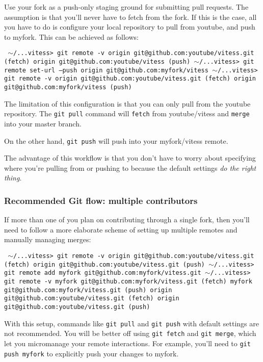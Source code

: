 Use your fork as a push-only staging ground for submitting pull requests. The
assumption is that you'll never have to fetch from the fork. If this is the
case, all you have to do is configure your local repository to pull from
youtube, and push to myfork. This can be achieved as follows:

{\tt 
\ensuremath{\sim}/...vitess\textgreater{} git remote -v
origin  git@github.com:youtube/vitess.git (fetch)
origin  git@github.com:youtube/vitess (push)
\ensuremath{\sim}/...vitess\textgreater{} git remote set-url --push origin git@github.com:myfork/vitess
\ensuremath{\sim}/...vitess\textgreater{} git remote -v
origin  git@github.com:youtube/vitess.git (fetch)
origin  git@github.com:myfork/vitess (push)
}

The limitation of this configuration is that you can only pull from the youtube
repository. The {\tt git pull} command will {\tt fetch} from youtube/vitess and {\tt merge}
into your master branch.

On the other hand, {\tt git push} will push into your myfork/vitess remote.

The advantage of this workflow is that you don't have to worry about specifying
where you're pulling from or pushing to because the default settings \emph{do the
right thing}.

\subsubsection{Recommended Git flow: multiple contributors}\hypertarget{recommended-git-flow-multiple-contributors}{}\label{recommended-git-flow-multiple-contributors}

If more than one of you plan on contributing through a single fork, then you'll
need to follow a more elaborate scheme of setting up multiple remotes and
manually managing merges:

{\tt 
\ensuremath{\sim}/...vitess\textgreater{} git remote -v
origin  git@github.com:youtube/vitess.git (fetch)
origin  git@github.com:youtube/vitess.git (push)
\ensuremath{\sim}/...vitess\textgreater{} git remote add myfork git@github.com:myfork/vitess.git
\ensuremath{\sim}/...vitess\textgreater{} git remote -v
myfork  git@github.com:myfork/vitess.git (fetch)
myfork  git@github.com:myfork/vitess.git (push)
origin  git@github.com:youtube/vitess.git (fetch)
origin  git@github.com:youtube/vitess.git (push)
}

With this setup, commands like {\tt git pull} and {\tt git push} with default settings
are not recommended. You will be better off using {\tt git fetch} and {\tt git merge},
which let you micromanage your remote interactions. For example, you'll need to
{\tt git push myfork} to explicitly push your changes to myfork.

